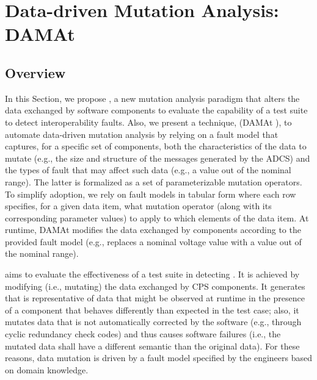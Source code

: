\clearpage
\section{Data-driven Mutation Analysis: DAMAt}
\label{sec:damat}

\renewcommand{\APPR}{DAMAt\xspace{} }


\subsection{Overview}

In this Section, we propose , 
a new mutation analysis paradigm
that alters the data exchanged by software components to evaluate the capability of a test suite to detect interoperability faults. Also, we present a technique,  (\APPR),
to automate data-driven mutation analysis by relying on
a fault model that captures, for a specific set of components, both the characteristics of the data to mutate (e.g., the size and structure of the messages generated by the ADCS) and the types of fault that may affect such data (e.g., a  value out of the nominal range). The latter is formalized as a set of parameterizable mutation operators. 
To simplify adoption, we rely on fault models in tabular form where each row specifies, for a given data item, what mutation operator (along with its corresponding parameter values) to apply to which elements of the data item.
At runtime, \APPR modifies the data exchanged by components according to the provided fault model (e.g., replaces a nominal voltage value with a value out of the nominal range).






 aims to evaluate the effectiveness of a test suite in detecting . 
It is achieved by modifying (i.e., mutating) the data exchanged by CPS components. It generates  that is representative of data that might be observed at runtime in the presence of a component that behaves differently than expected in the test case; also, it mutates  data that is not automatically corrected by the software 
(e.g., through cyclic redundancy check codes)
and thus causes software failures (i.e., the mutated data shall have a different semantic than the original data). For these reasons, data mutation is driven by a fault model specified by the engineers based on domain knowledge.

